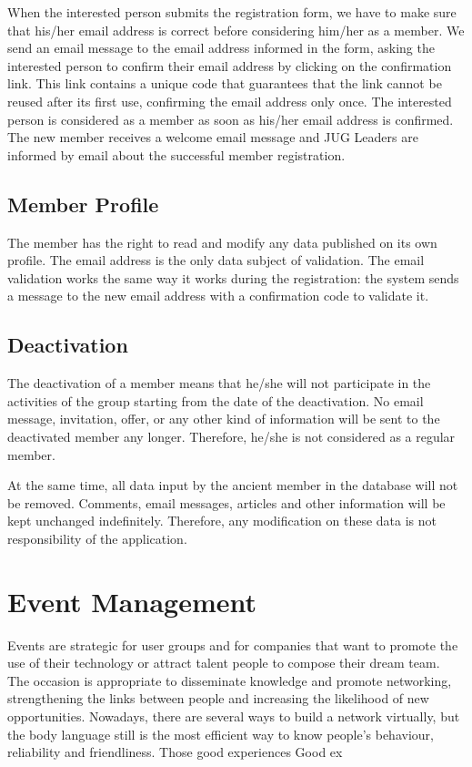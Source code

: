 \documentclass[envcountsame,envcountchap,letterpaper]{svmono}
\begin{document}
When the interested person submits the registration form, we have to make sure that his/her email address is correct before considering him/her as a member. We send an email message to the email address informed in the form, asking the interested person to confirm their email address by clicking on the confirmation link. This link contains a unique code that guarantees that the link cannot be reused after its first use, confirming the email address only once. The interested person is considered as a member as soon as his/her email address is confirmed. The new member receives a welcome email message and JUG Leaders are informed by email about the successful member registration.

\section{Member Profile}

The member has the right to read and modify any data published on its own profile. The email address is the only data subject of validation. The email validation works the same way it works during the registration: the system sends a message to the new email address with a confirmation code to validate it.

\section{Deactivation}

The deactivation of a member means that he/she will not participate in the activities of the group  starting from the date of the deactivation. No email message, invitation, offer, or any other kind of information will be sent to the deactivated member any longer. Therefore, he/she is not considered as a regular member.

At the same time, all data input by the ancient member in the database will not be removed. Comments, email messages, articles and other information will be kept unchanged indefinitely. Therefore, any modification on these data is not responsibility of the application.

\chapter{Event Management}
\label{chp:event-management}

Events are strategic for user groups and for companies that want to promote the use of their technology or attract talent people to compose their dream team. The occasion is appropriate to disseminate knowledge and promote networking, strengthening the links between people and increasing the likelihood of new opportunities. Nowadays, there are several ways to build a network virtually, but the body language still is the most efficient way to know people's behaviour, reliability and friendliness. Those good experiences Good ex
\end{document}
